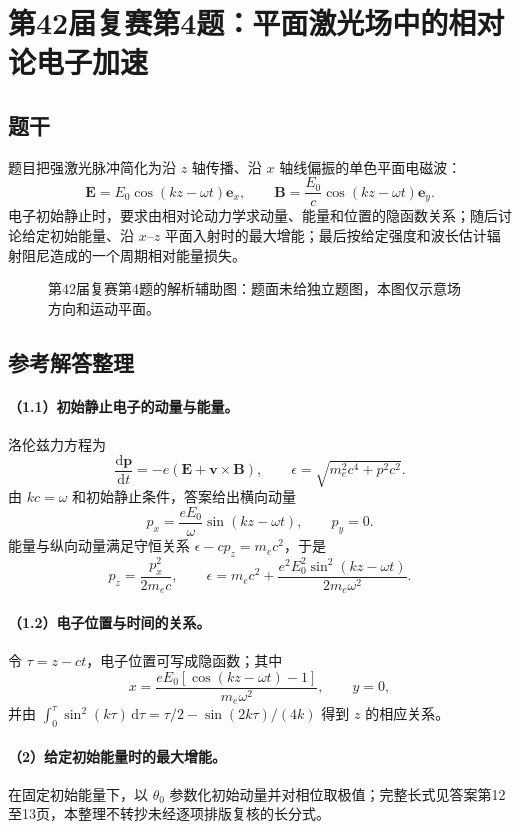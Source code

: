 \section{第42届复赛第4题：平面激光场中的相对论电子加速}
\subsection{题干}
题目把强激光脉冲简化为沿 $z$ 轴传播、沿 $x$ 轴线偏振的单色平面电磁波：
\[\boldsymbol E=E_0\cos(kz-\omega t)\boldsymbol e_x,\qquad
\boldsymbol B=\frac{E_0}{c}\cos(kz-\omega t)\boldsymbol e_y.\]
电子初始静止时，要求由相对论动力学求动量、能量和位置的隐函数关系；随后讨论给定初始能量、沿 $x$--$z$ 平面入射时的最大增能；最后按给定强度和波长估计辐射阻尼造成的一个周期相对能量损失。
\begin{figure}[htbp]\centering\caption{第42届复赛第4题的解析辅助图：题面未给独立题图，本图仅示意场方向和运动平面。}\end{figure}
\subsection{参考解答整理}
\paragraph{（1.1）初始静止电子的动量与能量。}
洛伦兹力方程为
\[\frac{\mathrm d\boldsymbol p}{\mathrm dt}=-e(\boldsymbol E+\boldsymbol v\times\boldsymbol B),\qquad
\epsilon=\sqrt{m_e^2c^4+p^2c^2}.\]
由 $kc=\omega$ 和初始静止条件，答案给出横向动量
\[p_x=\frac{eE_0}{\omega}\sin(kz-\omega t),\qquad p_y=0.\]
能量与纵向动量满足守恒关系 $\epsilon-cp_z=m_ec^2$，于是
\[p_z=\frac{p_x^2}{2m_ec},\qquad
\epsilon=m_ec^2+\frac{e^2E_0^2\sin^2(kz-\omega t)}{2m_e\omega^2}.\]
\paragraph{（1.2）电子位置与时间的关系。}
令 $\tau=z-ct$，电子位置可写成隐函数；其中
\[x=\frac{eE_0[\cos(kz-\omega t)-1]}{m_e\omega^2},\qquad y=0,\]
并由 $\int_0^\tau\sin^2(k\tau)\,\mathrm d\tau=\tau/2-\sin(2k\tau)/(4k)$ 得到 $z$ 的相应关系。
\paragraph{（2）给定初始能量时的最大增能。}
在固定初始能量下，以 $\theta_0$ 参数化初始动量并对相位取极值；完整长式见答案第12至13页，本整理不转抄未经逐项排版复核的长分式。

